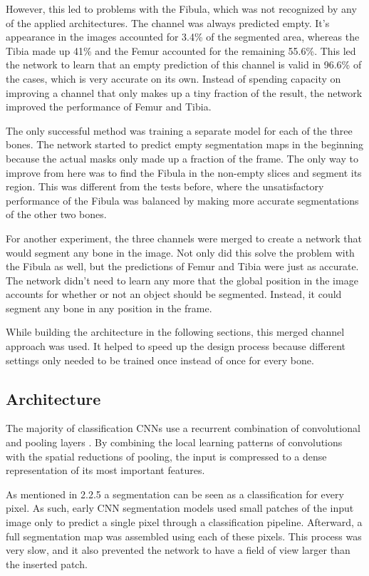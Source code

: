 However, this led to problems with the Fibula, which was not recognized by any of the applied architectures. The channel was always predicted empty. It's appearance in the images accounted for 3.4\% of the segmented area, whereas the Tibia made up 41\% and the Femur accounted for the remaining 55.6\%. This led the network to learn that an empty prediction of this channel is valid in 96.6\% of the cases, which is very accurate on its own. Instead of spending capacity on improving a channel that only makes up a tiny fraction of the result, the network improved the performance of Femur and Tibia.

The only successful method was training a separate model for each of the three bones. The network started to predict empty segmentation maps in the beginning because the actual masks only made up a fraction of the frame. The only way to improve from here was to find the Fibula in the non-empty slices and segment its region. This was different from the tests before, where the unsatisfactory performance of the Fibula was balanced by making more accurate segmentations of the other two bones.

For another experiment, the three channels were merged to create a network that would segment any bone in the image. Not only did this solve the problem with the Fibula as well, but the predictions of Femur and Tibia were just as accurate. The network didn't need to learn any more that the global position in the image accounts for whether or not an object should be segmented. Instead, it could segment any bone in any position in the frame.

While building the architecture in the following sections, this merged channel approach was used. It helped to speed up the design process because different settings only needed to be trained once instead of once for every bone.

\subsection{Architecture}

The majority of classification CNNs use a recurrent combination of convolutional and pooling layers \cite{Krizhevsky}\cite{He2015b}\cite{Iandola2016a}\cite{Ronneberger2015a}. By combining the local learning patterns of convolutions with the spatial reductions of pooling, the input is compressed to a dense representation of its most important features.

As mentioned in 2.2.5 a segmentation can be seen as a classification for every pixel. As such, early CNN segmentation models used small patches of the input image only to predict a single pixel through a classification pipeline. Afterward, a full segmentation map was assembled using each of these pixels. This process was very slow, and it also prevented the network to have a field of view larger than the inserted patch.


